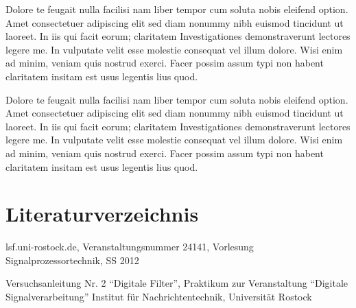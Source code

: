 \documentclass[a4paper,12pt,fontsize=12,DIV=12]{scrartcl}
\begin{document}
Dolore te feugait nulla facilisi nam liber tempor cum soluta nobis eleifend option. Amet consectetuer adipiscing elit sed diam nonummy nibh euismod tincidunt ut laoreet. In iis qui facit eorum; claritatem Investigationes demonstraverunt lectores legere me. In vulputate velit esse molestie consequat vel illum dolore. Wisi enim ad minim, veniam quis nostrud exerci. Facer possim assum typi non habent claritatem insitam est usus legentis lius quod.

Dolore te feugait nulla facilisi nam liber tempor cum soluta nobis eleifend option. Amet consectetuer adipiscing elit sed diam nonummy nibh euismod tincidunt ut laoreet. In iis qui facit eorum; claritatem Investigationes demonstraverunt lectores legere me. In vulputate velit esse molestie consequat vel illum dolore. Wisi enim ad minim, veniam quis nostrud exerci. Facer possim assum typi non habent claritatem insitam est usus legentis lius quod.

\clearpage

\section{Literaturverzeichnis}

lsf.uni-rostock.de, Veranstaltungsnummer 24141, Vorlesung Signalprozessortechnik, SS 2012
\newline

Versuchsanleitung Nr. 2 "`Digitale Filter"', Praktikum zur Veranstaltung "`Digitale Signalverarbeitung"' Institut für Nachrichtentechnik, Universität Rostock
\end{document}
